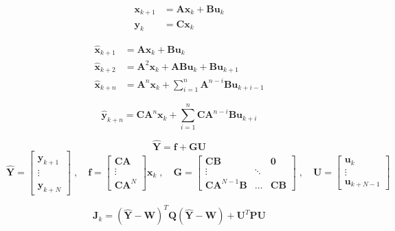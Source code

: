 \documentclass{article}
\begin{document}
	\begin{align}
		\bm{x}_{k+1} &= \bm{A}\bm{x}_k + \bm{B}\bm{u}_k \\
		\bm{y}_k &= \bm{C}\bm{x}_k
	\end{align}

	\begin{align}
		\bm{\hat{x}}_{k+1} &= \bm{A}\bm{x}_k + \bm{B}\bm{u}_k \\
		\bm{\hat{x}}_{k+2} &= \bm{A}^2\bm{x}_k + \bm{A}\bm{B}\bm{u}_k + \bm{B}\bm{u}_{k+1}\\
		\bm{\hat{x}}_{k+n} &= \bm{A}^n\bm{x}_k + \sum_{i=1}^n \bm{A}^{n-i}\bm{B}\bm{u}_{k+i-1}
	\end{align}

	\begin{equation}
		\bm{\hat{y}}_{k+n} = \bm{C}\bm{A}^n\bm{x}_k + \sum_{i=1}^n \bm{C}\bm{A}^{n-i}\bm{B}\bm{u}_{k+i}
	\end{equation}

	\begin{equation}
		\bm{\hat{Y}} = \bm{f} + \bm{G}\bm{U}
	\end{equation}
	\begin{equation}
		\bm{\hat{Y}}
		=
		\begin{bmatrix}
			\bm{\hat{y}}_{k+1} \\
			\vdots \\
			\bm{\hat{y}}_{k+N}
		\end{bmatrix}
		\;,\quad 
		\bm{f}
		=
		\begin{bmatrix}
			\bm{C}\bm{A} \\
			\vdots \\
			\bm{C}\bm{A}^N
		\end{bmatrix}
		\bm{x}_k
		\;,\quad 
		\bm{G}
		=
		\begin{bmatrix}
			\bm{C}\bm{B} &  & \bm{0} \\
			\vdots & \ddots & \\
			\bm{C}\bm{A}^{N-1}\bm{B} & \dots & \bm{C}\bm{B}
		\end{bmatrix}
		\;,\quad 
		\bm{U}
		=
		\begin{bmatrix}
			\bm{u}_{k} \\
			\vdots \\
			\bm{u}_{k+N-1}
		\end{bmatrix}
	\end{equation}

	\begin{equation}
	\bm{J}_k = (\bm{\hat{Y}}-\bm{W})^T \bm{Q} (\bm{\hat{Y}}-\bm{W}) + \bm{U}^T\bm{P}\bm{U}
	\end{equation}
\end{document}
